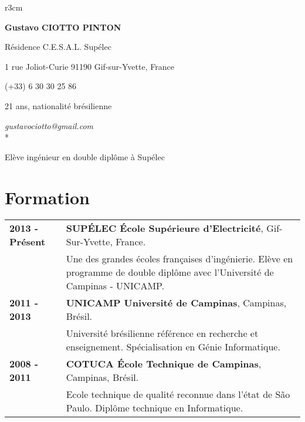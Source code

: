 \documentclass[10pt, a4paper]{article}
\author{Gustavo Ciotto Pinton}
\begin{document}
\pagestyle{empty} 

\begin{wrapfigure}{r}{3cm}
  \vspace{-20pt}
  \begin{center}
  \end{center}
\end{wrapfigure}

\textbf{\LARGE Gustavo CIOTTO PINTON}

Résidence C.E.S.A.L. Supélec

1 rue Joliot-Curie 91190 Gif-sur-Yvette, France

(+33) 6 30 30 25 86	

21 ans, nationalité brésilienne

\textit{gustavociotto@gmail.com} \\*

{\centerline {\large Elève ingénieur en double diplôme à Supélec}}


\section{Formation}

\begin{tabular}{p{} p{}}

 \textbf{2013 - Présent} & \textbf{SUPÉLEC  École Supérieure d'Electricité}, Gif-Sur-Yvette, France. \\ 
 & Une des grandes écoles françaises d'ingénierie. Elève en programme de double
 diplôme avec l'Université de Campinas - UNICAMP. \\
 
 \textbf{2011 - 2013} & \textbf{UNICAMP Université de Campinas}, Campinas, Brésil. \\ 
 & Université brésilienne référence en recherche et enseignement. Spécialisation
 en Génie Informatique. \\
 
 
 \textbf{2008 - 2011} & \textbf{COTUCA École Technique de Campinas}, Campinas, Brésil. \\ 
 & Ecole technique de qualité reconnue dans l’état de São Paulo. Diplôme
 technique en Informatique. \\
\end{tabular}
\end{document}
